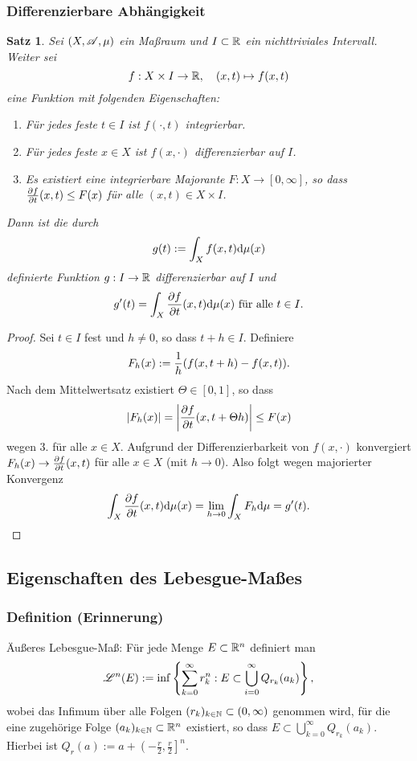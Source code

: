 \documentclass[
 a4paper,
 12pt,
 parskip=half
 ]{scrartcl}
\theoremstyle{plain}
\newtheorem*{thm*}{Satz}
\theoremstyle{definition}
\numberwithin{equation}{section}
\begin{document}
\subsubsection{Differenzierbare Abhängigkeit}
\begin{thm*}
 Sei $(X, \mathscr{A}, \mu)$ ein Maßraum und $I \subset \mathbb{R}$ ein nichttriviales Intervall. Weiter sei 
 \[ f: X \times I \to \mathbb{R}, \quad (x,t) \mapsto f(x,t) \]
 eine Funktion mit folgenden Eigenschaften:
 \begin{enumerate}
  \item Für jedes feste $t \in I$ ist $f( \cdot, t )$ integrierbar.
  \item Für jedes feste $x \in X$ ist $f( x, \cdot )$ differenzierbar auf $I$.
  \item Es existiert eine integrierbare Majorante $F: X \to [0,\infty]$, so dass $\frac{\partial f}{\partial t}(x,t) \le F(x)$ für alle $(x,t) \in X \times I$.
 \end{enumerate}
 Dann ist die durch
 \[ g(t) := \int_X f(x,t) \mathrm{d} \mu(x)  \]
 definierte Funktion $g: I \to \mathbb{R}$ differenzierbar auf $I$ und
 \[ g'(t) = \int_X \frac{\partial f}{\partial t}(x,t) \mathrm{d} \mu(x) \text{ für alle } t \in I. \]
\end{thm*}

\begin{proof}
 Sei $t \in I$ fest und $h \ne 0$, so dass $t+h \in I$. Definiere
 \[ F_h(x) := \frac{1}{h}( f(x, t+h) - f(x,t) ). \]
 Nach dem Mittelwertsatz existiert $\Theta \in [0,1]$, so dass
 \[ |F_h(x)| = \left| \frac{\partial f}{\partial t} (x, t + \Theta h) \right| \le F(x) \]
 wegen 3. für alle $x \in X$. Aufgrund der Differenzierbarkeit von $f(x, \cdot)$ konvergiert $F_h(x) \to \frac{\partial f}{\partial t}(x,t)$ für alle $x \in X$ (mit $h \to 0$). Also folgt wegen majorierter Konvergenz
 \[ \int_X \frac{\partial f}{\partial t}(x,t) \mathrm{d} \mu(x) = \lim_{h \to 0} \int_X F_h \mathrm{d} \mu = g'(t). \qedhere \]
\end{proof}

\subsection{Eigenschaften des Lebesgue-Maßes}
\subsubsection{Definition (Erinnerung)}
 Äußeres Lebesgue-Maß: Für jede Menge $E \subset \mathbb{R}^n$ definiert man
 \[ \mathscr{L}^n( E ) := \inf \left\{ \sum_{k=0}^\infty r_k^n : E \subset \bigcup_{i=0}^\infty Q_{r_k}(a_k) \right\}, \]
 wobei das Infimum über alle Folgen $(r_k)_{k \in \mathbb{N}} \subset (0, \infty)$ genommen wird, für die eine zugehörige Folge $(a_k)_{k \in \mathbb{N}} \subset \mathbb{R}^n$ existiert, so dass $E \subset \bigcup_{k=0}^\infty Q_{r_k}(a_k)$. Hierbei ist $Q_{r}(a) := a + \left(-\frac{r}{2}, \frac{r}{2} \right]^n$.
\end{document}

